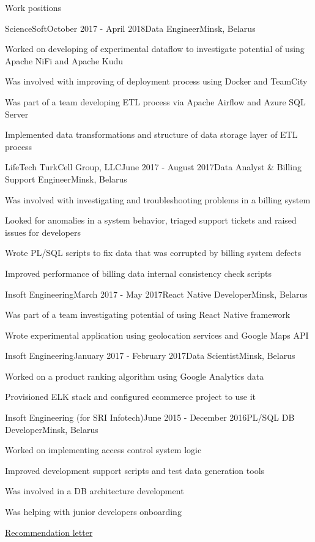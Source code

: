 \documentclass{resume} %
\begin{document}
\begin{rSection}{Work positions}
\begin{rSubsection}{ScienceSoft}{October 2017 - April 2018}{Data Engineer}{Minsk, Belarus}
\item Worked on developing of experimental dataflow to investigate potential of using Apache NiFi and Apache Kudu
\item Was involved with improving of deployment process using Docker and TeamCity
\item Was part of a team developing ETL process via Apache Airflow and Azure SQL Server
\item Implemented data transformations and structure of data storage layer of ETL process
\end{rSubsection}

\begin{rSubsection}{LifeTech TurkCell Group, LLC}{June 2017 - August 2017}{Data Analyst \& Billing Support Engineer}{Minsk, Belarus}
\item Was involved with investigating and troubleshooting problems in a billing system
\item Looked for anomalies in a system behavior, triaged support tickets and raised issues for developers
\item Wrote PL/SQL scripts to fix data that was corrupted by billing system defects
\item Improved performance of billing data internal consistency check scripts
\end{rSubsection}

\begin{rSubsection}{Insoft Engineering}{March 2017 - May 2017}{React Native Developer}{Minsk, Belarus}
\item Was part of a team investigating potential of using React Native framework
\item Wrote experimental application using geolocation services and Google Maps API
\end{rSubsection}

\begin{rSubsection}{Insoft Engineering}{January 2017 - February 2017}{Data Scientist}{Minsk, Belarus}
\item Worked on a product ranking algorithm using Google Analytics data
\item Provisioned ELK stack and configured ecommerce project to use it
\end{rSubsection}

\begin{rSubsection}{Insoft Engineering (for SRI Infotech)}{June 2015 - December 2016}{PL/SQL DB Developer}{Minsk, Belarus}
\item Worked on implementing access control system logic
\item Improved development support scripts and test data generation tools
\item Was involved in a DB architecture development
\item Was helping with junior developers onboarding
\item \href{https://drive.google.com/file/d/0B256DYrZGsaVZHZJb3FMQ01hVHM/view}{Recommendation letter}
\end{rSubsection}


\end{rSection}
\end{document}
